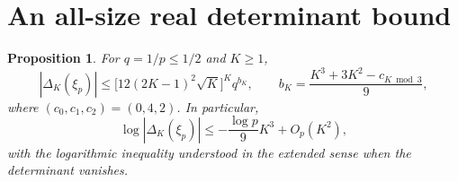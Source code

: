\documentclass[11pt,letterpaper]{article}
\numberwithin{equation}{section}
\newtheorem{proposition}[theorem]{Proposition}
\theoremstyle{remark}
\begin{document}
\section{An all-size real determinant bound}

\begin{proposition}\label{prop:analytic}
For $q=1/p\le1/2$ and $K\ge1$,
\begin{equation}\label{eq:analytic-exact}
 |\Delta_K(\xi_p)|\le
 \bigl[12(2K-1)^2\sqrt K\bigr]^Kq^{b_K},
 \qquad
 b_K=\frac{K^3+3K^2-c_{K\bmod3}}9,
\end{equation}
where $(c_0,c_1,c_2)=(0,4,2)$. In particular,
\begin{equation*}
 \log|\Delta_K(\xi_p)|\le-\frac{\log p}{9}K^3+O_p(K^2),
\end{equation*}
with the logarithmic inequality understood in the extended sense when the determinant vanishes.
\end{proposition}
\end{document}
